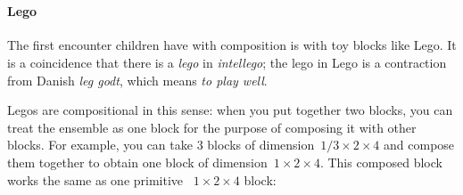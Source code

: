 

\section{}

\paragraph{Lego}
The first encounter children have with composition is with toy blocks like Lego. It is a coincidence that there is a \emph{lego} in \emph{intellego};
the lego in Lego is a contraction from Danish \emph{leg godt}, which means \emph{to play well}.

Legos are compositional in this sense: when you put together two blocks, you can treat the ensemble as one block for the purpose of composing it with other blocks.
For example, you can take 3 blocks of dimension~$1/3 \times 2 \times 4$ and compose them together to obtain one block of dimension~$1 \times 2 \times 4$. This composed block works the same as one primitive ~$1 \times 2 \times 4 $ block:

